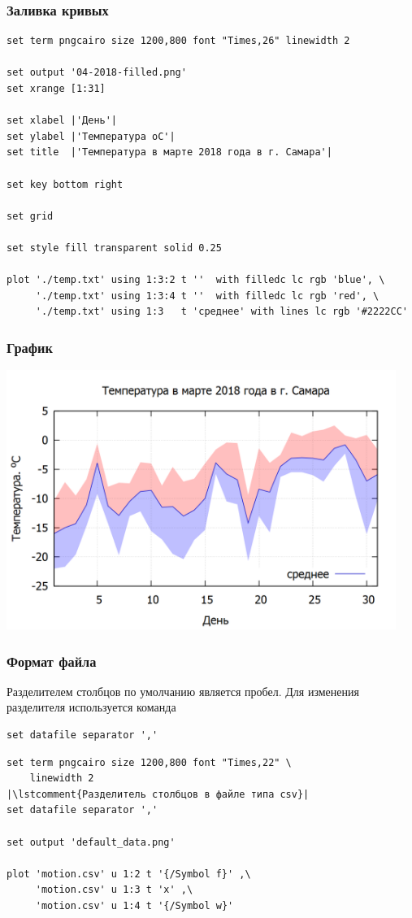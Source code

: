 \documentclass[12pt, compress]{beamer}
\newcommand{\lstcomment}[1]{\textcolor{dark-green}{\# \texttt{#1}}}
\begin{document}
\begin{frame}[t,fragile]
\frametitle{Заливка кривых}
\begin{lstlisting}[basicstyle={\scriptsize}]
set term pngcairo size 1200,800 font "Times,26" linewidth 2

set output '04-2018-filled.png'
set xrange [1:31]

set xlabel |'День'|
set ylabel |'Температура oС'|
set title  |'Температура в марте 2018 года в г. Самара'|

set key bottom right

set grid 

set style fill transparent solid 0.25

plot './temp.txt' using 1:3:2 t ''  with filledc lc rgb 'blue', \
     './temp.txt' using 1:3:4 t ''  with filledc lc rgb 'red', \
     './temp.txt' using 1:3   t 'среднее' with lines lc rgb '#2222CC'
\end{lstlisting}  
\end{frame}

\begin{frame}[t]
\frametitle{График}
\includegraphics[width=0.95\textwidth]{./gp/04-2018-filled.png}
\end{frame}


\begin{frame}[c,fragile]
\frametitle{Формат файла}
Разделителем столбцов по умолчанию является пробел. Для изменения разделителя используется команда
\begin{lstlisting}[numbers=none]
set datafile separator ','
\end{lstlisting}

\begin{lstlisting}
set term pngcairo size 1200,800 font "Times,22" \
    linewidth 2
|\lstcomment{Разделитель столбцов в файле типа csv}|
set datafile separator ','

set output 'default_data.png'

plot 'motion.csv' u 1:2 t '{/Symbol f}' ,\
     'motion.csv' u 1:3 t 'x' ,\
     'motion.csv' u 1:4 t '{/Symbol w}'
\end{lstlisting}  
\end{frame}
\end{document}
